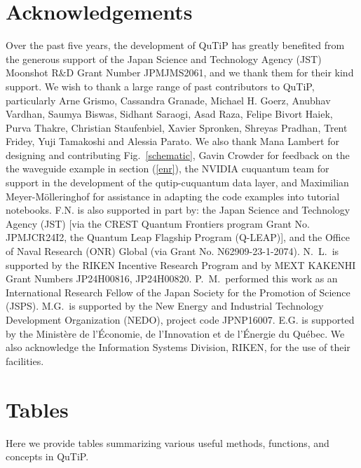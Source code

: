 \documentclass[preprint,3p,sort&compress]{elsarticle}
\newcommand{\fig}[1]{Fig.~\ref{#1}}
\begin{document}
\section{Acknowledgements} 
Over the past five years, the development of QuTiP has greatly benefited from the generous support of the Japan Science and Technology Agency (JST) Moonshot R\&D Grant Number JPMJMS2061, and we thank them for their kind support.
We wish to thank a large range of past contributors to QuTiP, particularly Arne Grismo, Cassandra Granade, Michael H. Goerz, Anubhav Vardhan, Saumya Biswas, Sidhant Saraogi, Asad Raza, Felipe Bivort Haiek, Purva Thakre, Christian Staufenbiel, Xavier Spronken, Shreyas Pradhan, Trent Fridey, Yuji Tamakoshi and Alessia Parato. We also thank Mana Lambert for designing and contributing \fig{schematic}, Gavin Crowder for feedback on the the waveguide example in section (\ref{enr}), the NVIDIA cuquantum team for support in the development of the qutip-cuquantum data layer, and Maximilian Meyer-M\"olleringhof for assistance in adapting the code examples into tutorial notebooks.  F.N. is also supported in part by: the Japan Science and Technology Agency (JST) [via the CREST Quantum Frontiers program Grant No. JPMJCR24I2, the Quantum Leap Flagship Program (Q-LEAP)], and the Office of Naval Research (ONR) Global (via Grant No. N62909-23-1-2074).  N.~L.~is supported by the RIKEN Incentive Research Program and by MEXT KAKENHI Grant Numbers JP24H00816, JP24H00820. P.~M.\ performed this work as an International Research Fellow of the Japan Society for the Promotion of Science (JSPS). M.G.~is supported by the New Energy and Industrial Technology Development Organization (NEDO), project code JPNP16007. E.G. is supported by the Ministère de l’Économie, de l’Innovation et de l’Énergie du Québec. We also acknowledge the Information Systems
Division, RIKEN, for the use of their facilities.


\appendix
\newpage
\section{Tables}
Here we provide tables summarizing various useful methods, functions, and concepts in QuTiP.
\end{document}
